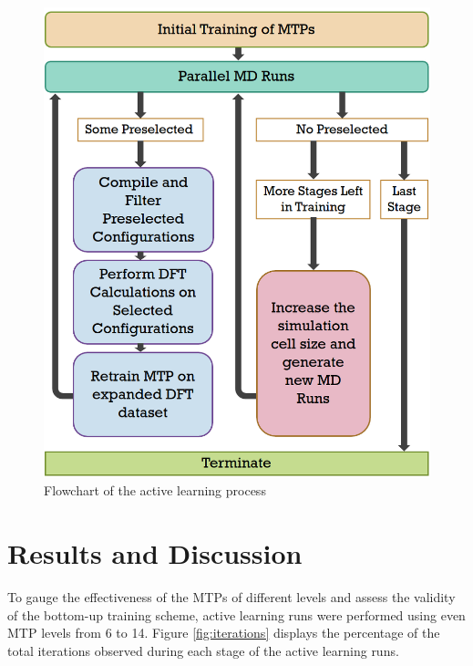\documentclass[9pt,twocolumn,twoside]{opticajnl}
\begin{document}
\begin{figure}[ht]
  \centering
  \includegraphics[width=\linewidth]{assets/trainingScheme.png}
  \caption{Flowchart of the active learning process}
  \label{fig:scheme}
\end{figure}


\section{Results and Discussion}
To gauge the effectiveness of the MTPs of different levels and assess the validity of the bottom-up training scheme, active learning runs were performed using even MTP levels from 6 to 14. Figure \ref{fig:iterations} displays the percentage of the total iterations observed during each stage of the active learning runs. 
\end{document}
